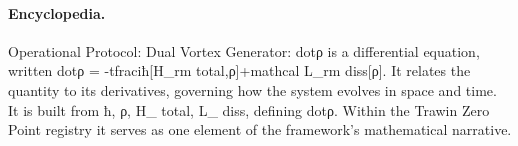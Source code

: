 \paragraph{Encyclopedia.}
Operational Protocol: Dual Vortex Generator: dotρ is a differential equation, written dotρ = -tfraciħ[H\_rm total,ρ]+mathcal L\_rm diss[ρ]. It relates the quantity to its derivatives, governing how the system evolves in space and time. It is built from ħ, ρ, H\_ total, L\_ diss, defining dotρ. Within the Trawin Zero Point registry it serves as one element of the framework's mathematical narrative.
